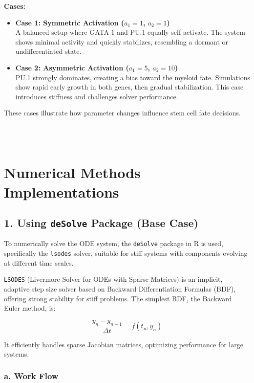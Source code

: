 \documentclass[journal]{IEEEtran}
\begin{document}
\textbf{Cases:}
\begin{itemize}
    \item \textbf{Case 1: Symmetric Activation ($a_1 = 1$, $a_2 = 1$)} \\
    A balanced setup where GATA-1 and PU.1 equally self-activate. The system shows minimal activity and quickly stabilizes, resembling a dormant or undifferentiated state.

    \item \textbf{Case 2: Asymmetric Activation ($a_1 = 5$, $a_2 = 10$)} \\
PU.1 strongly dominates, creating a bias toward the myeloid fate. Simulations show rapid early growth in both genes, then gradual stabilization. This case introduces stiffness and challenges solver performance.
\end{itemize}

These cases illustrate how parameter changes influence stem cell fate decisions.


\\
\\

\section{Numerical Methods Implementations}

\subsection{1. Using \texttt{deSolve} Package (Base Case)}

To numerically solve the ODE system, the \texttt{deSolve} package in R is used, specifically the \texttt{lsodes} solver, suitable for stiff systems with components evolving at different time scales.

\texttt{LSODES} (Livermore Solver for ODEs with Sparse Matrices) is an implicit, adaptive step size solver based on Backward Differentiation Formulas (BDF), offering strong stability for stiff problems. The simplest BDF, the Backward Euler method, is:

\begin{equation}
\frac{y_n - y_{n-1}}{\Delta t} = f(t_n, y_n)
\end{equation}

It efficiently handles sparse Jacobian matrices, optimizing performance for large systems.




\subsubsection*{\textbf{a. Work Flow}} \hfill 
\end{document}
